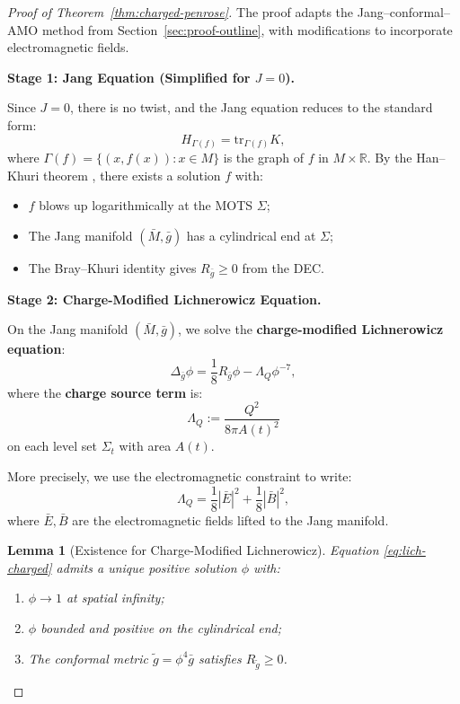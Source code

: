 \documentclass[12pt]{article}
\theoremstyle{plain}
\newtheorem{lemma}[theorem]{Lemma}
\theoremstyle{definition}
\theoremstyle{remark}
\newcommand{\tr}{\mathrm{tr}}
\begin{document}
\begin{proof}[Proof of Theorem~\ref{thm:charged-penrose}]
The proof adapts the Jang--conformal--AMO method from Section~\ref{sec:proof-outline}, with modifications to incorporate electromagnetic fields.

\textbf{Stage 1: Jang Equation (Simplified for $J = 0$).}

Since $J = 0$, there is no twist, and the Jang equation reduces to the standard form:
\begin{equation}
    H_{\Gamma(f)} = \tr_{\Gamma(f)} K,
\end{equation}
where $\Gamma(f) = \{(x, f(x)) : x \in M\}$ is the graph of $f$ in $M \times \mathbb{R}$. By the Han--Khuri theorem \cite{hankhuri2013}, there exists a solution $f$ with:
\begin{itemize}
    \item $f$ blows up logarithmically at the MOTS $\Sigma$;
    \item The Jang manifold $(\bar{M}, \bar{g})$ has a cylindrical end at $\Sigma$;
    \item The Bray--Khuri identity gives $R_{\bar{g}} \geq 0$ from the DEC.
\end{itemize}

\textbf{Stage 2: Charge-Modified Lichnerowicz Equation.}

On the Jang manifold $(\bar{M}, \bar{g})$, we solve the \textbf{charge-modified Lichnerowicz equation}:
\begin{equation}\label{eq:lich-charged}
    \Delta_{\bar{g}} \phi = \frac{1}{8}R_{\bar{g}}\phi - \Lambda_Q \phi^{-7},
\end{equation}
where the \textbf{charge source term} is:
\begin{equation}
    \Lambda_Q := \frac{Q^2}{8\pi A(t)^2}
\end{equation}
on each level set $\Sigma_t$ with area $A(t)$.

More precisely, we use the electromagnetic constraint to write:
\begin{equation}
    \Lambda_Q = \frac{1}{8}|\bar{E}|^2 + \frac{1}{8}|\bar{B}|^2,
\end{equation}
where $\bar{E}, \bar{B}$ are the electromagnetic fields lifted to the Jang manifold.

\begin{lemma}[Existence for Charge-Modified Lichnerowicz]\label{lem:lich-charged-exist}
Equation \eqref{eq:lich-charged} admits a unique positive solution $\phi$ with:
\begin{enumerate}[label=(\roman*)]
    \item $\phi \to 1$ at spatial infinity;
    \item $\phi$ bounded and positive on the cylindrical end;
    \item The conformal metric $\tilde{g} = \phi^4 \bar{g}$ satisfies $R_{\tilde{g}} \geq 0$.
\end{enumerate}
\end{lemma}


\end{proof}
\end{document}
